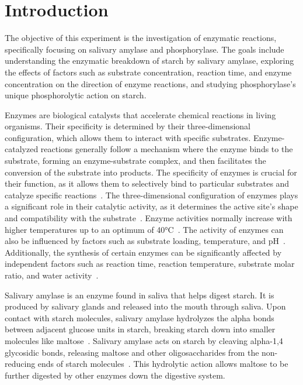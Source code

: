\documentclass[12pt]{article}
\begin{document}
    

    \section*{Introduction}
        The objective of this experiment is the investigation of enzymatic reactions, specifically focusing on salivary amylase and phosphorylase. 
        The goals include understanding the enzymatic breakdown of starch by salivary amylase, exploring the effects of factors such as substrate concentration, reaction time, and enzyme concentration on the direction of enzyme reactions, and studying phosphorylase's unique phosphorolytic action on starch. 

        Enzymes are biological catalysts that accelerate chemical reactions in living organisms. 
        Their specificity is determined by their three-dimensional configuration, which allows them to interact with specific substrates. 
        Enzyme-catalyzed reactions generally follow a mechanism where the enzyme binds to the substrate, forming an enzyme-substrate complex, and then facilitates the conversion of the substrate into products. 
        The specificity of enzymes is crucial for their function, as it allows them to selectively bind to particular substrates and catalyze specific reactions~\parencite{Bomati2005}. 
        The three-dimensional configuration of enzymes plays a significant role in their catalytic activity, as it determines the active site's shape and compatibility with the substrate~\parencite{Taylor2005}. 
        Enzyme activities normally increase with higher temperatures up to an optimum of 40°C~\parencite{Wolfenden1999}. 
        The activity of enzymes can also be influenced by factors such as substrate loading, temperature, and pH~\parencite{Aruna2021}. 
        Additionally, the synthesis of certain enzymes can be significantly affected by independent factors such as reaction time, reaction temperature, substrate molar ratio, and water activity~\parencite{Zheng2008}. 

        Salivary amylase is an enzyme found in saliva that helps digest starch. 
        It is produced by salivary glands and released into the mouth through saliva. Upon contact with starch molecules, salivary amylase hydrolyzes the alpha bonds between adjacent glucose units in starch, breaking starch down into smaller molecules like maltose~\parencite{Mandel2010}. 
        Salivary amylase acts on starch by cleaving alpha-1,4 glycosidic bonds, releasing maltose and other oligosaccharides from the non-reducing ends of starch molecules~\parencite{Santos2012}. 
        This hydrolytic action allows maltose to be further digested by other enzymes down the digestive system. 
\end{document}
